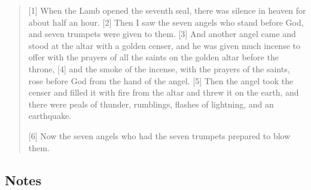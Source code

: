 \begin{quote}
  [1] When the Lamb opened the seventh seal, there was silence in heaven for
  about half an hour.  [2] Then I saw the seven angels who stand before God,
  and seven trumpets were given to them.  [3] And another angel came and
  stood at the altar with a golden censer, and he was given much incense to
  offer with the prayers of all the saints on the golden altar before the
  throne, [4] and the smoke of the incense, with the prayers of the saints,
  rose before God from the hand of the angel.  [5] Then the angel took the
  censer and filled it with fire from the altar and threw it on the earth,
  and there were peals of thunder, rumblings, flashes of lightning, and an
  earthquake.

  [6] Now the seven angels who had the seven trumpets prepared to blow them.
  \end{quote}
\subsection*{Notes}
